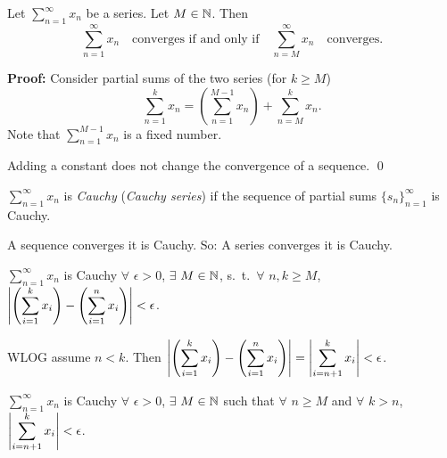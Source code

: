 \documentclass[10pt,aspectratio=169]{beamer}
\begin{document}
\begin{frame}

\begin{proposition}
Let $\displaystyle\sum_{n=1}^\infty x_n$ be a series.  Let $M \in {\mathbb{N}}$.  Then
\begin{equation*}
\sum_{n=1}^\infty x_n \quad \text{converges if and only if} \quad
\sum_{n=M}^\infty x_n \quad \text{converges.}
\end{equation*}
\end{proposition}

\pause
\textbf{Proof:}
Consider partial sums of the two series (for $k \geq M$)
\begin{equation*}
\sum_{n=1}^{k} x_n
=
\left(
\sum_{n=1}^{M-1} x_n
\right)
+
\sum_{n=M}^{k} x_n .
\end{equation*}
\pause
Note that 
$\sum_{n=1}^{M-1} x_n$ is a fixed number.

\pause
\medskip

Adding a constant does not change the convergence of a sequence.
\qed

\end{frame}

\begin{frame}

\begin{definition}
$\displaystyle\sum_{n=1}^\infty x_n$ is \emph{Cauchy} (\emph{Cauchy series})
if the sequence of partial sums $\{ s_n \}_{n=1}^\infty$ is Cauchy.
\end{definition}

\pause
A sequence converges \wiffif it is Cauchy.
\pause \quad So:
A series converges \wiffif it is Cauchy.

\pause
\medskip

$\displaystyle\sum_{n=1}^\infty x_n$ is Cauchy \wiffif $\forall$ $\epsilon > 0$, $\exists$
$M \in {\mathbb{N}}$, s.\ t.\ $\forall$ $n,k \geq M$, ~
$\displaystyle
\left\lvert { \left( \sum_{i=1}^k x_i \right) - \left( \sum_{i=1}^n x_i \right) } \right\rvert
< \epsilon$.

\pause
\medskip

WLOG assume $n < k$.  Then
\quad
$\displaystyle
\left\lvert { \left( \sum_{i=1}^k x_i \right) - \left( \sum_{i=1}^n x_i \right) } \right\rvert
=
\left\lvert { \sum_{i={n+1}}^k x_i } \right\rvert
< \epsilon$.
\pause
\quad
\thus

\begin{proposition}
$\displaystyle\sum_{n=1}^\infty x_n$ is Cauchy \wiffif $\forall$ $\epsilon > 0$, 
$\exists$ $M \in {\mathbb{N}}$ such that $\forall$ $n \geq M$
and $\forall$ $k > n$, 
\quad
$\displaystyle \left\lvert { \sum_{i={n+1}}^k x_i } \right\rvert < \epsilon$.
\end{proposition}

\end{frame}
\end{document}
